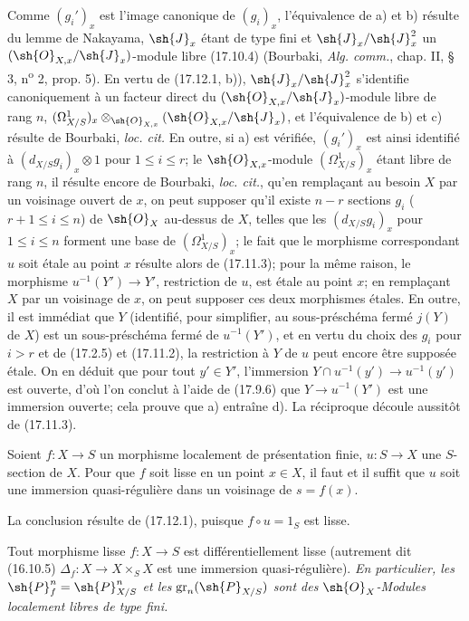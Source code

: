 Comme $(g_i')_x$ est l'image canonique de $(g_i)_x$, l'équivalence de a) et b) résulte du lemme de Nakayama, $\sh{J}_x$ étant de type fini et $\sh{J}_x/\sh{J}_x^2$ un $(\sh{O}_{X,x}/\sh{J}_x)$-module libre (17.10.4) (Bourbaki, \emph{Alg. comm.}, chap. II, § 3, n\textsuperscript{o} 2, prop. 5). En vertu de (17.12.1, b)), $\sh{J}_x/\sh{J}_x^2$ s'identifie canoniquement à un facteur direct du $(\sh{O}_{X,x}/\sh{J}_x)$-module libre de rang $n$, $(\Omega^1_{X/S})_x\otimes_{\sh{O}_{X,x}}(\sh{O}_{X,x}/\sh{J}_x)$, et l'équivalence de b) et c) résulte de Bourbaki, \emph{loc. cit.} En outre, si a) est vérifiée, $(g_i')_x$ est ainsi identifié à $(d_{X/S}g_i)_x\otimes1$ pour $1\leq i\leq r$; le $\sh{O}_{X,x}$-module $(\Omega^1_{X/S})_x$ étant libre de rang $n$, il résulte encore de Bourbaki, \emph{loc. cit.}, qu'en remplaçant au besoin $X$ par un voisinage ouvert de $x$, on peut supposer qu'il existe $n-r$ sections $g_i$ ($r+1\leq i\leq n$) de $\sh{O}_X$ au-dessus de $X$, telles que les $(d_{X/S}g_i)_x$ pour $1\leq i\leq n$ forment une base de $(\Omega^1_{X/S})_x$; le fait que le morphisme correspondant $u$ soit étale au point $x$ résulte alors de (17.11.3); pour la même raison, le morphisme $u^{-1}(Y')\to Y'$, restriction de $u$, est étale au point $x$; en remplaçant $X$ par un voisinage de $x$, on peut supposer ces deux morphismes étales. En outre, il est immédiat que $Y$ (identifié, pour simplifier, au sous-préschéma fermé $j(Y)$ de $X$) est un sous-préschéma fermé de $u^{-1}(Y')$, et en vertu du choix des $g_i$ pour $i>r$ et de (17.2.5) et (17.11.2), la restriction à $Y$ de $u$ peut encore être supposée étale. On en déduit que pour tout $y'\in Y'$, l'immersion $Y\cap u^{-1}(y')\to u^{-1}(y')$ est ouverte, d'où l'on conclut à l'aide de (17.9.6) que $Y\to u^{-1}(Y')$ est une immersion ouverte; cela prouve que a) entraîne d). La réciproque découle aussitôt de (17.11.3).

\begin{corollary}[17.12.3]
\label{IV.17.12.3}
Soient $f:X\to S$ un morphisme localement de présentation finie, $u:S\to X$ une $S$-section de $X$. Pour que $f$ soit lisse en un point $x\in X$, il faut et il suffit que $u$ soit une immersion quasi-régulière dans un voisinage de $s=f(x)$.
\end{corollary}

La conclusion résulte de (17.12.1), puisque $f\circ u=1_S$ est lisse.

\begin{proposition}[17.12.4]
\label{IV.17.12.4}
Tout morphisme lisse $f:X\to S$ est différentiellement lisse (autrement dit (16.10.5) $\Delta_f:X\to X\times_SX$ est une immersion quasi-régulière). \emph{En particulier, les $\sh{P}_f^n=\sh{P}_{X/S}^n$ et les $\operatorname{gr}_n(\sh{P}_{X/S})$ sont des $\sh{O}_X$-Modules localement libres de type fini.}
\end{proposition}

